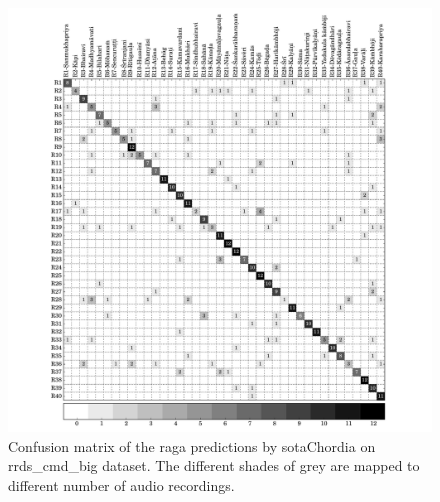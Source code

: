 \begin{figure}
	\begin{center}
		\includegraphics[width=\figSizeNinety]{ch07_ragaRecognition/figures/CM_vsm_cmd_var1.pdf}
	\end{center}
	\caption{Confusion matrix of the \gls{raga} predictions by \acrshort{sotaChordia} on \acrshort{rrds_cmd_big} dataset. The different shades of grey are mapped to different number of audio recordings.}
	\label{fig:confusion_matrix_cmd_chordia}
\end{figure}

